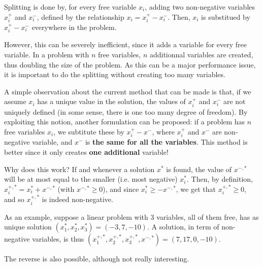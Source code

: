 \begin{center}
\end{center}

Splitting is done by, for every free variable $x_i$, adding two non-negative variables $x_i^+$ and $x_i^-$, defined by the relationship $x_i = x_i^+ - x_i^-$. Then, $x_i$ is substitued by $ x_i^+ - x_i^-$ everywhere in the problem.

However, this can be severely inefficient, since it adds a variable for every free variable. In a problem with $n$ free variables, $n$ additionnal variables are created, thus doubling the size of the problem. As this can be a major performance issue, it is important to do the splitting without creating too many variables. 

A simple observation about the current method that can be made is that, if we assume $x_i$ has a unique value in the solution, the values of $x_i^+$ and $x_i^-$ are not uniquely defined (in some sense, there is one too many degree of freedom). By exploiting this notion, another formulation can be proposed: if a problem has $n$ free variables $x_i$, we subtitute these by $x_i^+ - x^-$, where $x_i^+$ and $x^-$ are non-negative variable, and $x^-$ is \textbf{the same for all the variables}. This method is better since it only creates \textbf{one additional} variable!

Why does this work? If and whenever a solution $x^*$ is found, the value of $x^{-,*}$ will be at most equal to the smaller (i.e. most negative) $x_i^*$. Then, by definition, $x_i^{+,*} = x_i^* + x^{-,*}$ (with $x^{-,*} \geq 0$), and since $x_i^* \geq -x^{-,*}$, we get that $x_i^{+,*} \geq 0$, and so $x_i^{+,*}$ is indeed non-negative. 

As an example, suppose a linear problem with 3 variables, all of them free, has as unique solution $(x_1^*, x_2^*, x_3^*) = (-3, 7, -10)$. A solution, in term of non-negative variables, is thus $(x_1^{+,*}, x_2^{+,*}, x_3^{+,*}, x^{-,*}) = (7,17,0,-10)$.

\vspace{5pt}
The reverse is also possible, although not really interesting.

